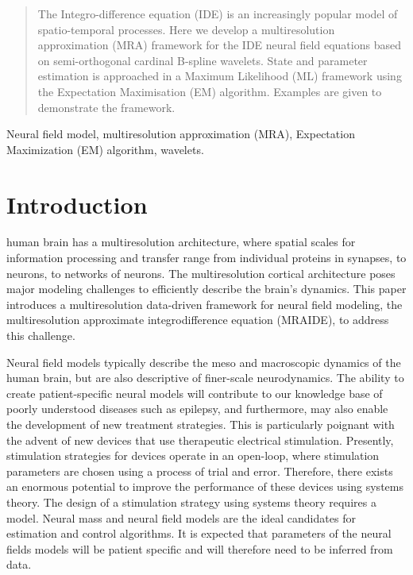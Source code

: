 \documentclass[journal,a4paper]{IEEEtran}
\begin{document}
\begin{abstract}
The Integro-difference equation (IDE) is an increasingly popular model of spatio-temporal processes. Here we develop a multiresolution approximation (MRA) framework for the IDE neural field equations based on semi-orthogonal cardinal B-spline wavelets. State and parameter estimation is approached in a Maximum Likelihood (ML) framework using the Expectation Maximisation (EM) algorithm. Examples are given to demonstrate the framework.
\end{abstract}

\begin{IEEEkeywords}
Neural field model, multiresolution approximation (MRA), Expectation Maximization (EM) algorithm, wavelets.
\end{IEEEkeywords}

\IEEEpeerreviewmaketitle

\section{Introduction}
 human brain has a multiresolution architecture, where spatial scales for information processing and transfer range from individual proteins in synapses, to neurons, to networks of neurons. The multiresolution cortical architecture poses major modeling challenges to efficiently describe the brain's dynamics. This paper introduces a multiresolution data-driven framework for neural field modeling, the multiresolution approximate integrodifference equation (MRAIDE), to address this challenge. 

Neural field models typically describe the meso and macroscopic dynamics of the human brain, but are also descriptive of finer-scale neurodynamics. The ability to create patient-specific neural models will contribute to our knowledge base of poorly understood diseases such as epilepsy, and furthermore, may also enable the development of new treatment strategies. This is particularly poignant with the advent of new devices that use therapeutic electrical stimulation. Presently, stimulation strategies for devices operate in an open-loop, where stimulation parameters are chosen using a process of trial and error. Therefore, there exists an enormous potential to improve the performance of these devices using systems theory. The design of a stimulation strategy using systems theory requires a model. Neural mass and neural field models are the ideal candidates for estimation and control algorithms. It is expected that parameters of the neural fields models will be patient specific and will therefore need to be inferred from data.
\end{document}

